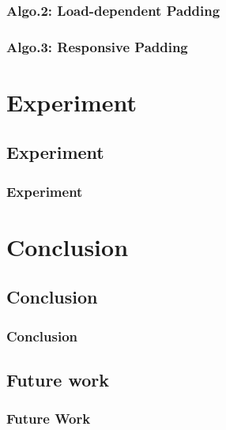 \documentclass{beamer}
\begin{document}
	\begin{frame}
	\frametitle{Algo.2: Load-dependent Padding}
	\end{frame}

	\begin{frame}
	\frametitle{Algo.3: Responsive Padding}
	\end{frame}

\section{Experiment}

\subsection{Experiment}
	\begin{frame}
	\frametitle{Experiment}
	\end{frame}

\section{Conclusion}

\subsection{Conclusion}
	\begin{frame}
	\frametitle{Conclusion}
	\end{frame}

\subsection{Future work}
	\begin{frame}
	\frametitle{Future Work}
	\end{frame}
\end{document}
